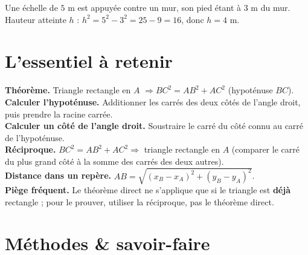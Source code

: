 \begin{illus}
\end{illus}

\begin{exemple}
Une échelle de $5$ m est appuyée contre un mur, son pied étant à $3$ m du mur. Hauteur
atteinte $h$ : $h^{2}=5^{2}-3^{2}=25-9=16$, donc $h=4$ m.
\end{exemple}

\section{L'essentiel à retenir}

\begin{synthese}
\textbf{Théorème.} Triangle rectangle en $A$ $\Rightarrow BC^{2}=AB^{2}+AC^{2}$
(hypoténuse $BC$).\\[4pt]
\textbf{Calculer l'hypoténuse.} Additionner les carrés des deux côtés de l'angle droit,
puis prendre la racine carrée.\\[4pt]
\textbf{Calculer un côté de l'angle droit.} Soustraire le carré du côté connu au carré de
l'hypoténuse.\\[4pt]
\textbf{Réciproque.} $BC^{2}=AB^{2}+AC^{2}\Rightarrow$ triangle rectangle en $A$ (comparer
le carré du plus grand côté à la somme des carrés des deux autres).\\[4pt]
\textbf{Distance dans un repère.} $AB=\sqrt{(x_B-x_A)^{2}+(y_B-y_A)^{2}}$.\\[4pt]
\textbf{Piège fréquent.} Le théorème direct ne s'applique que si le triangle est
\textbf{déjà} rectangle ; pour le prouver, utiliser la réciproque, pas le théorème direct.
\end{synthese}

\section{Méthodes \& savoir-faire}

